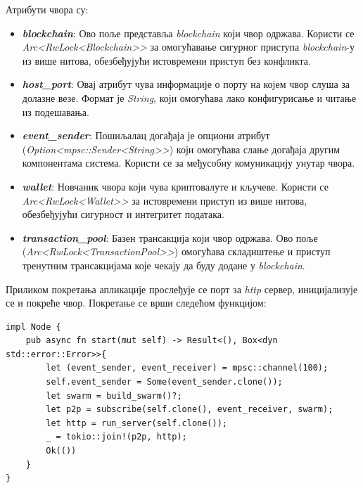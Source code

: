 \documentclass[12pt, a4paper]{article}
\begin{document}
Атрибути чвора су:
\begin{itemize}
    \item \textbf{\textit{blockchain}}: Ово поље представља \textit{blockchain} који чвор одржава. Користи се \textit{Arc<RwLock<Blockchain>>} за омогућавање сигурног приступа \textit{blockchain}-у из више нитова, обезбеђујући истовремени приступ без конфликта.
    \item \textbf{\textit{host\_port}}: Овај атрибут чува информације о порту на којем чвор слуша за долазне везе. Формат је \textit{String}, који омогућава лако конфигурисање и читање из подешавања.
    \item \textbf{\textit{event\_sender}}: Пошиљалац догађаја је опциони атрибут \newline(\textit{Option<mpsc::Sender<String>>}) који омогућава слање догађаја другим компонентама система. Користи се за међусобну комуникацију унутар чвора.
    \item \textbf{\textit{wallet}}: Новчаник чвора који чува криптовалуте и кључеве. Користи се \newline\textit{Arc<RwLock<Wallet>>} за истовремени приступ из више нитова, обезбеђујући сигурност и интегритет података.
    \item \textbf{\textit{transaction\_pool}}: Базен трансакција који чвор одржава. Ово поље \newline(\textit{Arc<RwLock<TransactionPool>>}) омогућава складиштење и приступ тренутним трансакцијама које чекају да буду додане у \textit{blockchain}.
\end{itemize}
\newpage
Приликом покретања апликације прослеђује се порт за \textit{http} сервер, иницијализује се и покреће чвор. Покретање се врши следећом функцијом:

\begin{verbatim}
impl Node {
    pub async fn start(mut self) -> Result<(), Box<dyn std::error::Error>>{
        let (event_sender, event_receiver) = mpsc::channel(100);
        self.event_sender = Some(event_sender.clone());
        let swarm = build_swarm()?;
        let p2p = subscribe(self.clone(), event_receiver, swarm);
        let http = run_server(self.clone());
        _ = tokio::join!(p2p, http);
        Ok(())
    }
}
\end{verbatim}
\end{document}
